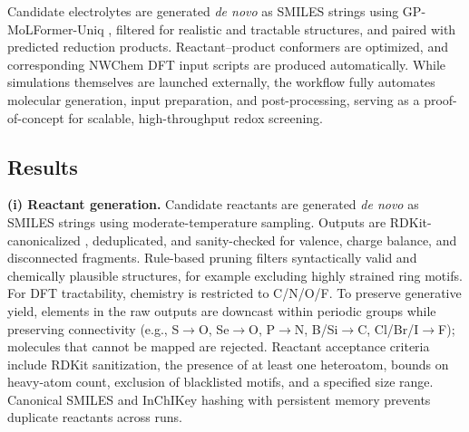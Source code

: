 Candidate electrolytes are generated \emph{de novo} as SMILES strings using GP-MoLFormer-Uniq \cite{ross2025gp}, filtered for realistic and tractable structures, and paired with predicted reduction products. Reactant–product conformers are optimized, and corresponding NWChem DFT input scripts are produced automatically. While simulations themselves are launched externally, the workflow fully automates molecular generation, input preparation, and post-processing, serving as a proof-of-concept for scalable, high-throughput redox screening.


\subsection*{Results}

\textbf{(i) Reactant generation.}
Candidate reactants are generated \emph{de novo} as SMILES strings using moderate-temperature sampling. Outputs are RDKit-canonicalized \cite{landrum2013rdkit}, deduplicated, and sanity-checked for valence, charge balance, and disconnected fragments. Rule-based pruning filters syntactically valid and chemically plausible structures, for example excluding highly strained ring motifs. For DFT tractability, chemistry is restricted to C/N/O/F. To preserve generative yield, elements in the raw outputs are downcast within periodic groups while preserving connectivity (e.g., S$\rightarrow$O, Se$\rightarrow$O, P$\rightarrow$N, B/Si$\rightarrow$C, Cl/Br/I$\rightarrow$F); molecules that cannot be mapped are rejected. Reactant acceptance criteria include RDKit sanitization, the presence of at least one heteroatom, bounds on heavy-atom count, exclusion of blacklisted motifs, and a specified size range. Canonical SMILES and InChIKey hashing with persistent memory prevents duplicate reactants across runs.

